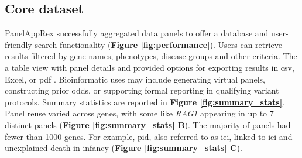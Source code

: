 \subsection{Core dataset}
PanelAppRex successfully aggregated data \DIFdelbegin {}\DIFdelend \DIFaddbegin {} panels \DIFdelbegin {}\DIFdelend to offer a database and user-friendly search functionality (\textbf{Figure \ref{fig:performance}}).
Users can retrieve results filtered by gene names, phenotypes, disease groups and other criteria. 
The \DIFdelbegin {}\DIFdelend \DIFaddbegin {}\DIFaddend a table view with panel details and provided options for exporting results in \ac{csv}, Excel, or \ac{pdf} \DIFaddbegin {}\DIFaddend .
Bioinformatic uses may include generating virtual panels, constructing prior odds, or supporting formal reporting in qualifying variant protocols.
Summary statistics are reported in 
\textbf{Figure \ref{fig:summary_stats}}. 
\DIFdelbegin {}\DIFdelend Panel reuse varied across genes, with some like \textit{RAG1} appearing in up to 7 distinct panels 
(\textbf{Figure \ref{fig:summary_stats} B}). 
The majority of panels had fewer than 1000 genes.
For example, \DIFdelbegin {}\DIFdelend \DIFaddbegin {}\DIFaddend \ac{pid}, also referred to as \ac{iei}, \DIFdelbegin {}\DIFdelend \DIFaddbegin {}\DIFaddend linked to \ac{iei} and unexplained death in infancy \DIFaddbegin {}\DIFaddend (\textbf{Figure \ref{fig:summary_stats} C}).

